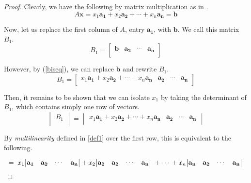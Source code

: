 \documentclass[11pt,reqno]{amsart}
\theoremstyle{definition}
\begin{document}
\begin{proof}
Clearly, we have the following by matrix multiplication as in \cite[Chapter 1.3]{strang}. \begin{equation}\label{biseq}
    A\mathbf{x} = x_1\mathbf{a_1} + x_2\mathbf{a_2} +\cdots + x_n\mathbf{a_n} =\mathbf{b}
\end{equation}

Now, let us replace the first column of $A$, entry $\mathbf{a_1}$, with $\mathbf{b}$. We call this matrix $B_1$.
\[
B_1 = 
\begin{bmatrix}
    \mathbf{b} & \mathbf{a_{2}} & \cdots & \mathbf{a_{n}}\\
\end{bmatrix}
\]

However, by (\ref{biseq}), we can replace $\mathbf{b}$ and rewrite $B_1$.
\[ B_1 = 
\begin{bmatrix}
    x_1\mathbf{a_1} + x_2\mathbf{a_2} +\cdots + x_n\mathbf{a_n} & \mathbf{a_{2}} & \cdots & \mathbf{a_{n}}\\
\end{bmatrix}
\]

Then, it remains to be shown that we can isolate $x_1$ by taking the determinant of $B_1$, which contains simply one row of vectors.
\[ 
\begin{vmatrix}
    B_1\\
\end{vmatrix}
= 
\begin{vmatrix}
    x_1\mathbf{a_1} + x_2\mathbf{a_2} +\cdots + x_n\mathbf{a_n} & \mathbf{a_{2}} & \cdots & \mathbf{a_{n}}\\
\end{vmatrix}
\]

By \textit{multilinearity} defined in \ref{def1} over the first row, this is equivalent to the following.

\[
 = \; x_1\!
    \begin{vmatrix}
        \mathbf{a_1} & \mathbf{a_{2}} & \cdots & \mathbf{a_{n}}\\
    \end{vmatrix}
    +x_2\!
    \begin{vmatrix}
        \mathbf{a_2} & \mathbf{a_{2}} & \cdots & \mathbf{a_{n}}\\
    \end{vmatrix}
    \; + \cdots\\
    +x_n\!
    \begin{vmatrix}
        \mathbf{a_n} & \mathbf{a_{2}} & \cdots & \mathbf{a_{n}}\\
    \end{vmatrix}\\
\]



\end{proof}
\end{document}
